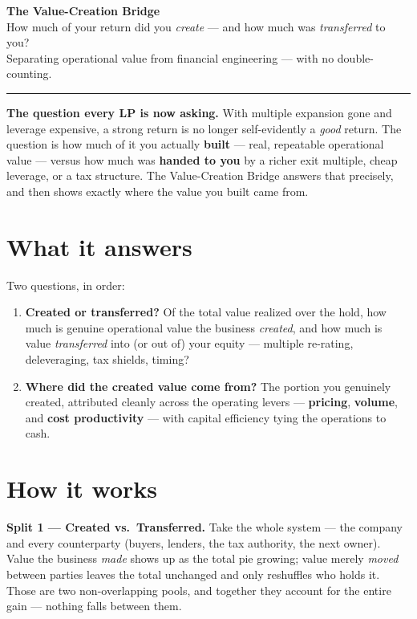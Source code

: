 \documentclass[11pt]{article}
\begin{document}
\begin{center}
{\LARGE\bfseries\color{creonavy} The Value-Creation Bridge}\\[4pt]
{\large\color{creoaccent} How much of your return did you \emph{create} --- and how much was
\emph{transferred} to you?}\\[5pt]
{\normalsize Separating operational value from financial engineering --- with no double-counting.}
\end{center}

\vspace{2pt}\hrule\vspace{8pt}

\begin{hook}
\textbf{The question every LP is now asking.} With multiple expansion gone and leverage
expensive, a strong return is no longer self-evidently a \emph{good} return. The question is
how much of it you actually \textbf{built} --- real, repeatable operational value --- versus
how much was \textbf{handed to you} by a richer exit multiple, cheap leverage, or a tax
structure. The Value-Creation Bridge answers that precisely, and then shows exactly where the
value you built came from.
\end{hook}

\section{What it answers}
Two questions, in order:
\begin{enumerate}[leftmargin=1.6em]
  \item \textbf{Created or transferred?} Of the total value realized over the hold, how much
  is genuine operational value the business \emph{created}, and how much is value
  \emph{transferred} into (or out of) your equity --- multiple re-rating, deleveraging, tax
  shields, timing?
  \item \textbf{Where did the created value come from?} The portion you genuinely created,
  attributed cleanly across the operating levers --- \textbf{pricing}, \textbf{volume}, and
  \textbf{cost productivity} --- with capital efficiency tying the operations to cash.
\end{enumerate}

\section{How it works}
\textbf{Split 1 --- Created vs.\ Transferred.} Take the whole system --- the company and every
counterparty (buyers, lenders, the tax authority, the next owner). Value the business
\emph{made} shows up as the total pie growing; value merely \emph{moved} between
parties leaves the total unchanged and only reshuffles who holds it. Those are two
non-overlapping pools, and together they account for the entire gain --- nothing falls
between them.
\end{document}
